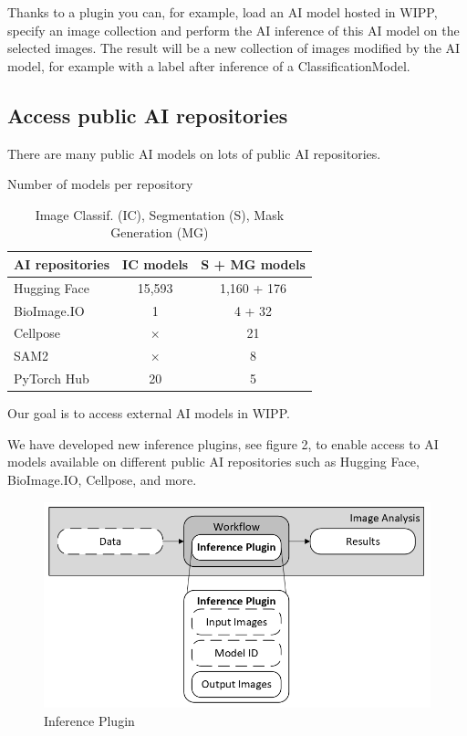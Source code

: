 Thanks to a plugin you can, for example, load an AI model hosted in
WIPP, specify an
image collection and perform the AI inference of this AI model on the
selected images.
The result will be a new collection of images modified by the AI model, for
example
with a label after inference of a \Gls{ClassificationModel}.

\subsection{Access public AI repositories}

There are many public AI models on lots of public AI repositories.

\begin{table}[H]
  \centering
  \caption{Number of models per repository}
  \begin{tabular}{lcc}
    \toprule
    AI repositories & IC models & S + MG models \\
    \midrule
    Hugging Face    & 15,593                      & 1,160 + 176 \\
    BioImage.IO     & 1                           & 4 + 32 \\
    Cellpose        & $\times$                    & 21 \\
    SAM2            & $\times$                    & 8 \\
    PyTorch Hub     & 20                          & 5 \\
    \bottomrule
  \end{tabular}
  \caption*{Image Classif. (IC), Segmentation (S), Mask Generation (MG)}
\end{table}

Our goal is to access external AI models in WIPP.


We have developed new inference plugins, see figure 2, to enable access to
AI models available on different public AI repositories such as
Hugging Face, BioImage.IO, Cellpose, and more.

\begin{figure}[H]
  \centering
  \includegraphics[width=1.0\linewidth]{png/methods/inference_plugin.png}
  \caption{Inference Plugin}
  \label{fig:2inference}
\end{figure}

